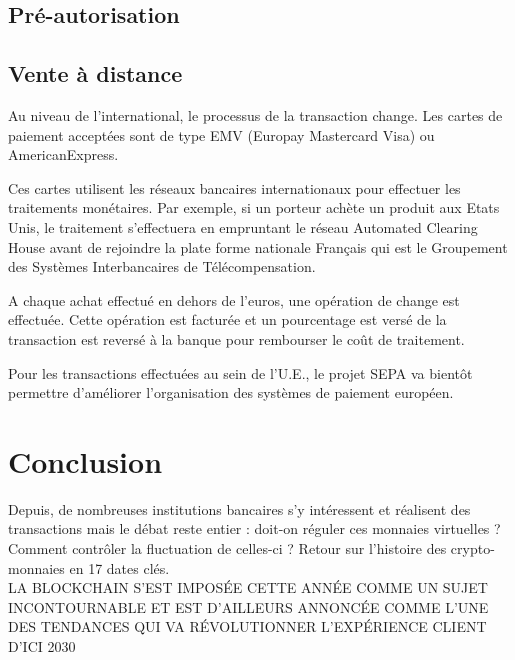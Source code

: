 \documentclass[12pt]{report}
\begin{document}
    \subsection{Pré-autorisation}
\hspace{1cm}

    \subsection{Vente à distance}
\hspace{1cm}
    
    
Au niveau de l'international, le processus de la transaction change. Les cartes de paiement acceptées sont de type EMV (Europay Mastercard Visa) ou AmericanExpress.

Ces cartes utilisent les réseaux bancaires internationaux pour effectuer les traitements monétaires. Par exemple, si un porteur achète un produit aux Etats Unis, le traitement s'effectuera en empruntant le réseau Automated Clearing House avant de rejoindre la plate forme nationale Français qui est le Groupement des Systèmes Interbancaires de Télécompensation.

A chaque achat effectué en dehors de l'euros, une opération de change est effectuée. Cette opération est facturée et un pourcentage est versé de la transaction est reversé à la banque pour rembourser le coût de traitement.

Pour les transactions effectuées au sein de l'U.E., le projet SEPA va bientôt permettre d'améliorer l'organisation des systèmes de paiement européen.


\newpage		
\section{Conclusion}
\hspace{1cm} Depuis, de nombreuses institutions bancaires s’y intéressent et réalisent des transactions mais le débat reste entier : doit-on réguler ces monnaies virtuelles ? Comment contrôler la fluctuation de celles-ci ? Retour sur l’histoire des crypto-monnaies en 17 dates clés.\\

LA BLOCKCHAIN S’EST IMPOSÉE CETTE ANNÉE COMME UN SUJET INCONTOURNABLE ET EST D’AILLEURS ANNONCÉE COMME L’UNE DES TENDANCES QUI VA RÉVOLUTIONNER L’EXPÉRIENCE CLIENT D’ICI 2030\\
\end{document}
